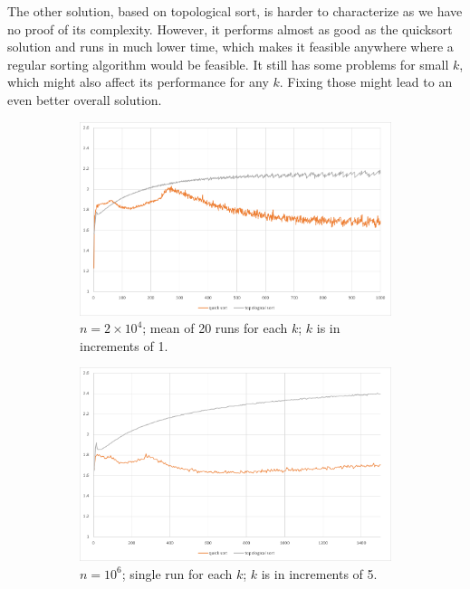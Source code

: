 \documentclass{article}
\begin{document}
The other solution, based on topological sort, is harder to characterize as we have no proof of its complexity. However, it performs almost as good as the quicksort solution and runs in much lower time, which makes it feasible anywhere where a regular sorting algorithm would be feasible. It still has some problems for small $ k $, which might also affect its performance for any $ k $. Fixing those might lead to an even better overall solution.

\begin{figure}[h]
\centering

\begin{subfigure}{0.85\textwidth}
\centering
\includegraphics[width=\textwidth]{2e4}
\caption{$ n = 2 \times 10^4 $; mean of 20 runs for each $k$; $k$ is in increments of 1.}
\label{fig:2e5}
\end{subfigure}

\begin{subfigure}{0.85\textwidth}
\centering
\includegraphics[width=\textwidth]{1e6}
\caption{$ n = 10^6 $; single run for each $k$; $k$ is in increments of 5.}
\label{fig:1e6}
\end{subfigure}

\caption{}
\label{fig:performance}

\end{figure}



\end{document}
